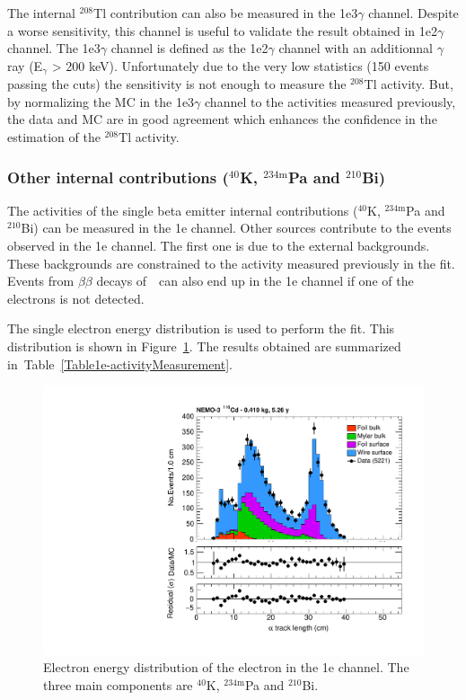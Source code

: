 \documentclass[main.tex]{subfiles}
\begin{document}
\bigskip


\NI The internal $^{\text{208}}$Tl contribution can also be measured in the 1e3$\gamma$ channel. Despite a worse sensitivity, this channel is useful to validate the result obtained in 1e2$\gamma$ channel. The 1e3$\gamma$ channel is defined as the  1e2$\gamma$ channel with an additionnal $\gamma$ ray (E$_{\gamma}$ > 200 keV). Unfortunately due to the very low statistics (150 events passing the cuts) the sensitivity is not enough to measure the $^{\text{208}}$Tl activity. But, by normalizing the MC in the 1e3$\gamma$ channel to the activities measured previously, the data and MC are in good agreement which enhances the confidence in the estimation of the $^{\text{208}}$Tl activity. 


\FloatBarrier


\subsubsection{Other internal contributions ($^{\text{40}}$K, $^{\text{234m}}$Pa and $^{\text{210}}$Bi)}\label{sec:1echannel}


\NI The activities of the single beta emitter internal contributions ($^{\text{40}}$K, $^{\text{234m}}$Pa and $^{\text{210}}$Bi) can be measured in the 1e channel. Other sources contribute to the events observed in the 1e channel. The first one is due to the external backgrounds. These backgrounds are constrained to the activity measured previously in the fit. Events from $\beta\beta$ decays of~\Cd~can also end up in the 1e channel if one of the electrons is not detected. 


\bigskip


\NI The single electron energy distribution is used to perform the fit. This distribution is shown in Figure~\ref{1eChannel_Ee}. The results obtained are summarized in~Table~\ref{Table1e-activityMeasurement}. 


\begin{figure}[h!]
\centering
\includegraphics[page=4,scale=0.55]{pictures/Chap6/FinalPlots.pdf}
\caption{Electron energy distribution of the electron in the 1e channel. The three main components are $^{\text{40}}$K, $^{\text{234m}}$Pa and $^{\text{210}}$Bi.}
\label{1eChannel_Ee}
\end{figure}
\end{document}
